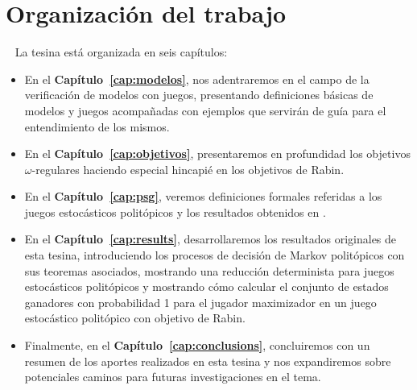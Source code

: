 \section{Organización del trabajo}
~\label{cap:intro:sec:outline}
La tesina está organizada en seis capítulos:

\begin{itemize}
	\item En el \textbf{Capítulo~\ref{cap:modelos}}, nos adentraremos en el campo de la
	      verificación de modelos con juegos, presentando definiciones básicas de modelos
	      y juegos acompañadas con ejemplos que servirán de guía para el entendimiento de
	      los mismos.

	\item En el \textbf{Capítulo~\ref{cap:objetivos}}, presentaremos en profundidad los
	      objetivos $\omega$-regulares haciendo especial hincapié en los objetivos de
	      Rabin.

	\item En el \textbf{Capítulo~\ref{cap:psg}}, veremos definiciones formales referidas
	      a los juegos estocásticos politópicos y los resultados obtenidos en
	      \cite{Polytopal}.

	\item En el \textbf{Capítulo~\ref{cap:results}}, desarrollaremos los resultados
	      originales de esta tesina, introduciendo los procesos de decisión de Markov
	      politópicos con sus teoremas asociados, mostrando una reducción determinista
	      para juegos estocásticos politópicos y mostrando cómo calcular el conjunto de
	      estados ganadores con probabilidad 1 para el jugador maximizador en un juego
	      estocástico politópico con objetivo de Rabin.

	\item Finalmente, en el \textbf{Capítulo~\ref{cap:conclusions}}, concluiremos con un
	      resumen de los aportes realizados en esta tesina y nos expandiremos sobre
	      potenciales caminos para futuras investigaciones en el tema.

\end{itemize}

